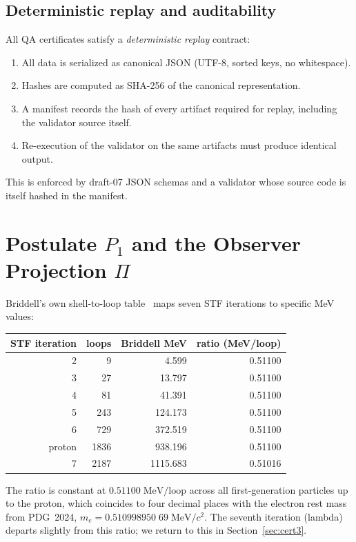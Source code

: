 \documentclass[12pt,a4paper]{article}
\begin{document}
\subsection{Deterministic replay and auditability}

All QA certificates satisfy a \emph{deterministic replay} contract:
\begin{enumerate}[nosep]
  \item All data is serialized as canonical JSON (UTF-8, sorted keys,
        no whitespace).
  \item Hashes are computed as SHA-256 of the canonical representation.
  \item A manifest records the hash of every artifact required for replay,
        including the validator source itself.
  \item Re-execution of the validator on the same artifacts must produce
        identical output.
\end{enumerate}
This is enforced by draft-07 JSON schemas and a validator whose source code
is itself hashed in the manifest.


\section{Postulate $P_1$ and the Observer Projection $\Pi$}
\label{sec:postulate}

Briddell's own shell-to-loop table~\cite[lines 1580--1587]{briddellbook2020}
maps seven STF iterations to specific MeV values:
\begin{center}
\begin{tabular}{rrrr}
\toprule
STF iteration & loops & Briddell MeV & ratio (MeV/loop) \\
\midrule
2 &  9 &    4.599 & 0.51100 \\
3 & 27 &   13.797 & 0.51100 \\
4 & 81 &   41.391 & 0.51100 \\
5 & 243 & 124.173 & 0.51100 \\
6 & 729 & 372.519 & 0.51100 \\
proton  & 1836 &  938.196 & 0.51100 \\
7 & 2187 & 1115.683 & 0.51016 \\
\bottomrule
\end{tabular}
\end{center}
The ratio is constant at $0.51100\;\mathrm{MeV/loop}$ across all
first-generation particles up to the proton, which coincides to four
decimal places with the electron rest mass from PDG~2024,
$m_e = 0.510998950\;69\;\mathrm{MeV}/c^2$. The seventh iteration
(lambda) departs slightly from this ratio; we return to this in
Section~\ref{sec:cert3}.
\end{document}
